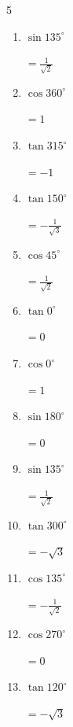 \begin{multicols}{5}
\begin{enumerate}
        $\displaystyle =\frac{1}{2}$

  \item $\displaystyle \sin{135^\circ}$

        $\displaystyle =\frac{1}{\sqrt{2}}$

  \item $\displaystyle \cos{360^\circ}$

        $\displaystyle =1$

  \item $\displaystyle \tan{315^\circ}$

        $\displaystyle =-1$

  \item $\displaystyle \tan{150^\circ}$

        $\displaystyle =-\frac{1}{\sqrt{3}}$

  \item $\displaystyle \cos{45^\circ}$

        $\displaystyle =\frac{1}{\sqrt{2}}$

  \item $\displaystyle \tan{0^\circ}$

        $\displaystyle =0$

  \item $\displaystyle \cos{0^\circ}$

        $\displaystyle =1$

  \item $\displaystyle \sin{180^\circ}$

        $\displaystyle =0$

  \item $\displaystyle \sin{135^\circ}$

        $\displaystyle =\frac{1}{\sqrt{2}}$

  \item $\displaystyle \tan{300^\circ}$

        $\displaystyle =-\sqrt{3}$

  \item $\displaystyle \cos{135^\circ}$

        $\displaystyle =-\frac{1}{\sqrt{2}}$

  \item $\displaystyle \cos{270^\circ}$

        $\displaystyle =0$

  \item $\displaystyle \tan{120^\circ}$

        $\displaystyle =-\sqrt{3}$


\end{enumerate}
\end{multicols}
